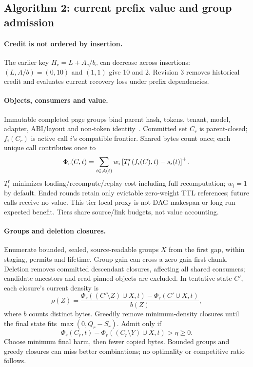 \subsection{Algorithm 2: current prefix value and group admission}
\paragraph{Credit is not ordered by insertion.}
The earlier key $H_c=L+A_c/b_c$ can decrease across insertions: $(L,A/b)=(0,10)$
and $(1,1)$ give 10 and 2. Revision 3 removes historical credit and evaluates
current recovery loss under prefix dependencies.

\paragraph{Objects, consumers and value.}
Immutable completed page groups bind parent hash, tokens, tenant, model,
adapter, ABI/layout and non-token identity~\cite{vllmPrefixCaching,zheng2024sglang}.
Committed set $C_r$ is parent-closed; $f_i(C_r)$ is active call $i$'s compatible
frontier. Shared bytes count once; each unique call contributes once to
\begin{equation}
\Phi_r(C,t)=\sum_{i\in\mathcal A(t)}w_i
 \left[T_i^r(f_i(C),t)-s_i(t)\right]^+.
\end{equation}
$T_i^r$ minimizes loading/recompute/replay cost including full recomputation;
$w_i=1$ by default. Ended rounds retain only evictable zero-weight TTL references;
future calls receive no value. This tier-local proxy is not DAG makespan or
long-run expected benefit. Tiers share source/link budgets, not value accounting.

\paragraph{Groups and deletion closures.}
Enumerate bounded, sealed, source-readable groups $X$ from the first gap,
within staging, permits and lifetime. Group gain can cross a zero-gain first
chunk. Deletion removes committed descendant closures, affecting all shared
consumers; candidate ancestors and read-pinned objects are excluded. In
tentative state $C'$, each closure's current density is
\begin{equation}
\rho(Z)=\frac{\Phi_r((C'\setminus Z)\cup X,t)-\Phi_r(C'\cup X,t)}{b(Z)},
\end{equation}
where $b$ counts distinct bytes. Greedily remove minimum-density closures
until the final state fits $\max(0,Q_r-S_r)$. Admit only if
\begin{equation}
\Phi_r(C_r,t)-\Phi_r((C_r\setminus Y)\cup X,t)>\eta\ge0.
\end{equation}
Choose minimum final harm, then fewer copied bytes. Bounded groups and greedy
closures can miss better combinations; no optimality or competitive ratio follows.

